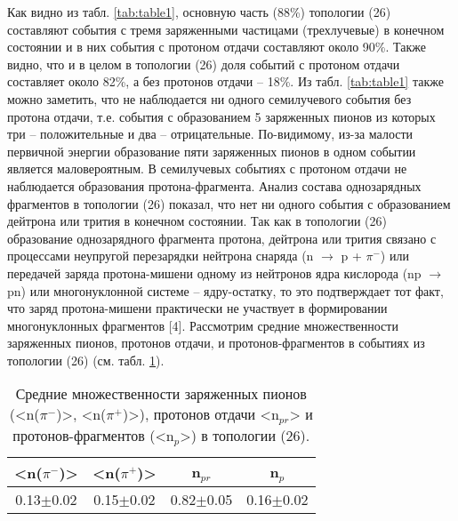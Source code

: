 \documentclass[fontsize=14pt]{scrarticle}
\begin{document}
Как видно из табл. \ref{tab:table1}, основную часть (88\%) топологии (26) составляют события с тремя заряженными частицами (трехлучевые) в конечном состоянии и в них события с протоном отдачи составляют около 90\%. Также видно, что и в целом в топологии (26) доля событий с протоном отдачи составляет около 82\%, а без протонов отдачи – 18\%. Из табл. \ref{tab:table1} также можно заметить, что не наблюдается ни одного семилучевого события без протона отдачи, т.е. события с образованием 5 заряженных пионов из которых три – положительные и два – отрицательные. По-видимому, из-за малости первичной энергии образование пяти заряженных пионов в одном событии является маловероятным. В семилучевых событиях с протоном отдачи не наблюдается образования протона-фрагмента. Анализ состава однозарядных фрагментов в топологии (26) показал, что нет ни одного события с образованием дейтрона или трития в конечном состоянии. Так как в топологии (26) образование однозарядного фрагмента протона, дейтрона или трития связано с процессами неупругой перезарядки нейтрона снаряда (n $\rightarrow$ p + $\pi^{-}$) или передачей заряда протона-мишени одному из нейтронов ядра кислорода (np $\rightarrow$ pn) или многонуклонной системе – ядру-остатку, то это подтверждает тот факт, что заряд протона-мишени практически не участвует в формировании многонуклонных фрагментов [4]. Рассмотрим средние множественности заряженных
пионов, протонов отдачи, и протонов-фрагментов в событиях из топологии (26) (см. табл. \ref{tab:table2}).


\begin{table}
    \centering
    \begin{tabular}{|c|c|c|c|}
    \hline
       <n($\pi^{-}$)>  &<n($\pi^{+}$)> &n$_{pr}$&n$_{p}$ \\
       \hline
         0.13$\pm$0.02&	0.15$\pm$0.02&	0.82$\pm$0.05&	0.16$\pm$0.02\\
         \hline
    \end{tabular}
    \caption{Средние множественности заряженных пионов (<n($\pi^{-}$)>, <n($\pi^{+}$)>), протонов отдачи <n$_{pr}$> и протонов-фрагментов (<n$_{p}$>) в топологии (26).}
    \label{tab:table2}
\end{table}
\end{document}
